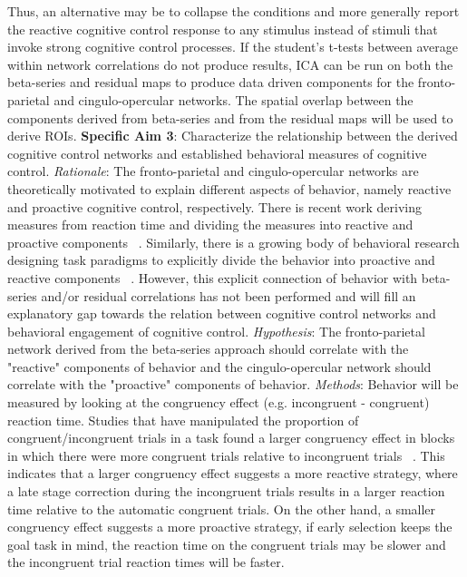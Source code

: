 \documentclass[phd,appendix,figures]{uithesis}
\begin{document}
Thus, an alternative may be to collapse the conditions and more generally report the reactive cognitive control response to any stimulus instead of stimuli that invoke strong cognitive control processes.
If the student's t-tests between average within network correlations do not produce results, ICA can be run on both the beta-series and residual maps to produce data driven components for the fronto-parietal and cingulo-opercular networks. The spatial overlap between the components derived from beta-series and from the residual maps will be used to derive ROIs.
\newline
\textbf{Specific Aim 3}: Characterize the relationship between the derived cognitive control networks and established behavioral measures of cognitive control.
\newline
\textit{Rationale}: The fronto-parietal and cingulo-opercular networks are theoretically motivated to explain different aspects of behavior, namely reactive and proactive cognitive control, respectively. 
There is recent work deriving measures from reaction time and dividing the measures into reactive and proactive components ~\citep{Fassbender2014}.
Similarly, there is a growing body of behavioral research designing task paradigms to explicitly divide the behavior into proactive and reactive components ~\citep{Gonthier2016,AppelBaum2014}.
However, this explicit connection of behavior with beta-series and/or residual correlations has not been performed and will fill an explanatory gap towards the relation between cognitive control networks and behavioral engagement of cognitive control.
\newline
\textit{Hypothesis}: The fronto-parietal network derived from the beta-series approach should correlate with the "reactive" components of behavior and the cingulo-opercular network should correlate with the "proactive" components of behavior.
\newline
\textit{Methods}: Behavior will be measured by looking at the congruency effect (e.g. incongruent - congruent) reaction time.
Studies that have manipulated the proportion of congruent/incongruent trials in a task  found a larger congruency effect in blocks in which there were more congruent trials relative to incongruent trials ~\citep{AppelBaum2014,Funes2010}.
This indicates that a larger congruency effect suggests a more reactive strategy, where a late stage correction during the incongruent trials results in a larger reaction time relative to the automatic congruent trials.
On the other hand, a smaller congruency effect suggests a more proactive strategy, if early selection keeps the goal task in mind, the reaction time on the congruent trials may be slower and the incongruent trial reaction times will be faster.
\end{document}
